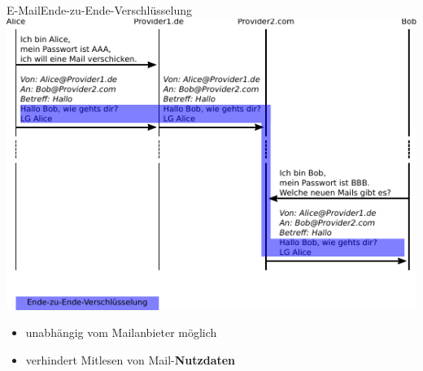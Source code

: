   \begin{frame}{E-Mail}{Ende-zu-Ende-Verschlüsselung}
    \includegraphics[width=.9\textwidth]{images/maildaten_e2e.pdf}
    \begin{itemize}
      \scriptsize
      \item unabhängig vom Mailanbieter möglich
      \item verhindert Mitlesen von Mail-\textbf{Nutzdaten}
    \end{itemize}
  \end{frame}

